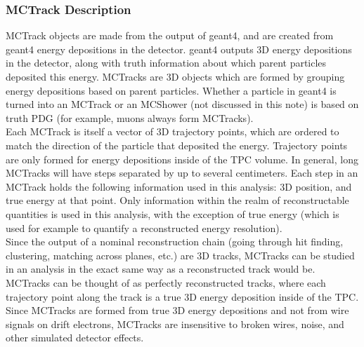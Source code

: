 \subsubsection{MCTrack Description}\label{MCTrack_section}
{\sc MCTrack} objects are made from the output of {\sc geant}4, and are created from {\sc geant}4 energy depositions in the detector. {\sc geant}4 outputs 3D energy depositions in the detector, along with truth information about which parent particles deposited this energy. {\sc MCTracks} are 3D objects which are formed by grouping energy depositions based on parent particles. Whether a particle in {\sc geant}4 is turned into an {\sc MCTrack} or an {\sc MCShower} (not discussed in this note) is based on truth PDG (for example, muons always form {\sc MCTracks}).\\

Each {\sc MCTrack} is itself a vector of 3D trajectory points, which are ordered to match the direction of the particle that deposited the energy. Trajectory points are only formed for energy depositions inside of the TPC volume. In general, long {\sc MCTrack}s will have steps separated by up to several centimeters. Each step in an {\sc MCTrack} holds the following information used in this analysis: 3D position, and true energy at that point. Only information within the realm of reconstructable quantities is used in this analysis, with the exception of true energy (which is used for example to quantify a reconstructed energy resolution).\\

Since the output of a nominal reconstruction chain (going through hit finding, clustering, matching across planes, etc.) are 3D tracks, {\sc MCTracks} can be studied in an analysis in the exact same way as a reconstructed track would be. {\sc MCTracks} can be thought of as perfectly reconstructed tracks, where each trajectory point along the track is a true 3D energy deposition inside of the {\ub} TPC.\\

Since {\sc MCTracks} are formed from true 3D energy depositions and not from wire signals on drift electrons, {\sc MCTracks} are insensitive to broken wires, noise, and other simulated detector effects.

